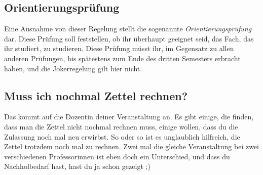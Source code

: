 \subsection{Orientierungsprüfung}
Eine Ausnahme von dieser Regelung stellt die sogenannte \emph{Orientierungsprüfung} dar. Diese Prüfung soll feststellen, ob ihr überhaupt geeignet seid, das Fach, das ihr studiert, zu studieren. Diese Prüfung müsst ihr, im Gegensatz zu allen anderen Prüfungen, bis spätestens zum Ende des dritten Semesters erbracht haben, und die Jokerregelung gilt hier nicht.

\subsection{Muss ich nochmal Zettel rechnen?}
Das kommt auf die Dozentin deiner Veranstaltung an. Es gibt einige, die finden, dass man die Zettel nicht nochmal rechnen muss, einige wollen, dass du die Zulassung noch mal neu erwirbst. So oder so ist es unglaublich hilfreich, die Zettel trotzdem noch mal zu rechnen. Zwei mal die gleiche Veranstaltung bei zwei verschiedenen Professorinnen ist eben doch ein Unterschied, und dass du Nachholbedarf hast, hast du ja schon gezeigt ;)
